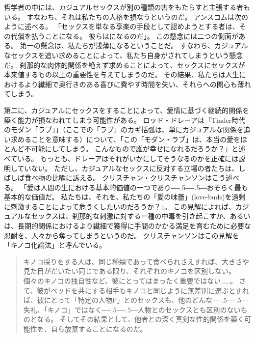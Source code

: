 \documentclass[paper=a4,book,openany]{jlreq}
\def\DDASH{―\kern-.5\zw―\kern-.5\zw―} %
\begin{document}
哲学者の中には、カジュアルセックスが別の種類の害をもたらすと主張する者もいる。
すなわち、それは私たちの人格を損なうというのだ。
アンスコムは次のように述べる。
「セックスを単なる享楽の手段として認めようとする者は、その代償を払うことになる。
彼らはになるのだ」\citep{anscombe72contraception}。
この懸念には二つの側面がある。
第一の懸念は、私たちが浅薄になるということだ。
すなわち、カジュアルなセックスを追い求めることによって、私たち自身がされてしまうという懸念だ。
刹那的な肉体的関係を絶えず求めることによって、セックスにセックスが本来値するもの以上の重要性を与えてしまうのだ。
その結果、私たちは人生におけるより繊細で奥行きのある喜びに費やす時間を失い、それらへの関心も薄れてしまう。

第二に、カジュアルにセックスをすることによって、愛情に基づく継続的関係を築く能力が損なわれてしまう可能性がある。
ロッド・ドレーアは「Tinder時代のモダン「ラブ」」（ここでの「ラブ」のカギ括弧は、単にカジュアルな関係を追い求めることを意味する）について、「この「モダン・ラブ」は、本当の愛をほとんど不可能にしてしまう。
こんなもので誰が幸せになれるだろうか？」と述べている\citep{dreher15:_moder_love_age_tind}。
もっとも、ドレーアはそれがいかにしてそうなるのかを正確には説明していない。
ただし、カジュアルなセックスに反対する立場の者たちは、しばしば食べ物の比喩に訴える。
クリスチャン・クリスチャンソンはこう述べる。
「愛は人間の生における基本的価値の一つであり{\DDASH}おそらく最も基本的な価値だ。
私たちは、それを、私たちの「愛の味蕾」(love-buds)を過剰に刺激することによって危うくしたいのだろうか？」\citep[p.105]{krisjansson98:_casual_sex_revis}。
この見解によれば、カジュアルなセックスは、刹那的な刺激に対する一種の中毒を引き起こすか、あるいは、長期的関係におけるより繊細で獲得に手間のかかる満足を育むために必要な忍耐を、人々から奪ってしまうというのだ。
クリスチャンソンはこの見解を「キノコ化論法」と呼んでいる。

\begin{quote}
  キノコ採りをする人は、同じ種類であって食べられさえすれば、大きさや見た目がだいたい同じである限り、それぞれのキノコを区別しない。
個々のキノコの独自性など、彼にとってはまったく重要ではない……。
さて、彼がベッドを共にする相手もキノコと同じように無差別に選ぶとすれば、彼にとって「特定の人物P」とのセックスも、他のどんな{\DDASH}失礼、「キノコ」ではなく{\DDASH}人物とのセックスとも区別のないものとなる。
そしてその結果として、他者との深く真剣な性的関係を築く可能性を、自ら放棄することになるのだ。
\citep[p.101]{krisjansson98:_casual_sex_revis}
\end{quote}
\end{document}
